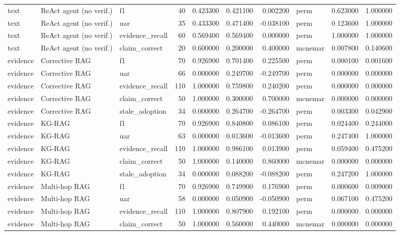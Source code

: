 \begin{table}
\begin{tabular}{lllrrrrlrr}
text & ReAct agent (no verif.) & f1 & 40 & 0.423300 & 0.421100 & 0.002200 & perm & 0.623000 & 1.000000 \\
text & ReAct agent (no verif.) & uar & 35 & 0.433300 & 0.471400 & -0.038100 & perm & 0.123600 & 1.000000 \\
text & ReAct agent (no verif.) & evidence\_recall & 60 & 0.569400 & 0.569400 & 0.000000 & perm & 1.000000 & 1.000000 \\
text & ReAct agent (no verif.) & claim\_correct & 20 & 0.600000 & 0.200000 & 0.400000 & mcnemar & 0.007800 & 0.140600 \\
evidence & Corrective RAG & f1 & 70 & 0.926900 & 0.701400 & 0.225500 & perm & 0.000100 & 0.001600 \\
evidence & Corrective RAG & uar & 66 & 0.000000 & 0.249700 & -0.249700 & perm & 0.000000 & 0.000000 \\
evidence & Corrective RAG & evidence\_recall & 110 & 1.000000 & 0.759800 & 0.240200 & perm & 0.000000 & 0.000000 \\
evidence & Corrective RAG & claim\_correct & 50 & 1.000000 & 0.300000 & 0.700000 & mcnemar & 0.000000 & 0.000000 \\
evidence & Corrective RAG & stale\_adoption & 34 & 0.000000 & 0.264700 & -0.264700 & perm & 0.003300 & 0.042900 \\
evidence & KG-RAG & f1 & 70 & 0.926900 & 0.840800 & 0.086100 & perm & 0.024400 & 0.244000 \\
evidence & KG-RAG & uar & 63 & 0.000000 & 0.013600 & -0.013600 & perm & 0.247400 & 1.000000 \\
evidence & KG-RAG & evidence\_recall & 110 & 1.000000 & 0.986100 & 0.013900 & perm & 0.059400 & 0.475200 \\
evidence & KG-RAG & claim\_correct & 50 & 1.000000 & 0.140000 & 0.860000 & mcnemar & 0.000000 & 0.000000 \\
evidence & KG-RAG & stale\_adoption & 34 & 0.000000 & 0.088200 & -0.088200 & perm & 0.247200 & 1.000000 \\
evidence & Multi-hop RAG & f1 & 70 & 0.926900 & 0.749900 & 0.176900 & perm & 0.000600 & 0.009000 \\
evidence & Multi-hop RAG & uar & 58 & 0.000000 & 0.050900 & -0.050900 & perm & 0.067100 & 0.475200 \\
evidence & Multi-hop RAG & evidence\_recall & 110 & 1.000000 & 0.807900 & 0.192100 & perm & 0.000000 & 0.000000 \\
evidence & Multi-hop RAG & claim\_correct & 50 & 1.000000 & 0.560000 & 0.440000 & mcnemar & 0.000000 & 0.000000 \\

\end{tabular}
\end{table}

